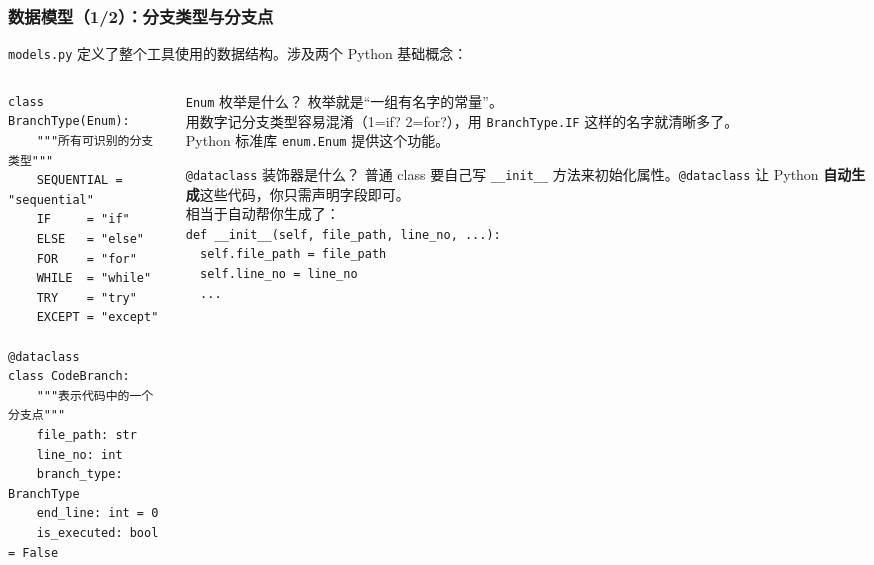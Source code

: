\documentclass[presentation,aspectratio=169]{ctexbeamer}
\begin{document}

\begin{frame}[fragile]
\frametitle{数据模型（1/2）：分支类型与分支点}
{\footnotesize \texttt{models.py} 定义了整个工具使用的数据结构。涉及两个 Python 基础概念：}

\vspace{0.1cm}
\begin{columns}[T]
\begin{column}{0.55\textwidth}
{\scriptsize
\begin{verbatim}
class BranchType(Enum):
    """所有可识别的分支类型"""
    SEQUENTIAL = "sequential"
    IF     = "if"
    ELSE   = "else"
    FOR    = "for"
    WHILE  = "while"
    TRY    = "try"
    EXCEPT = "except"

@dataclass
class CodeBranch:
    """表示代码中的一个分支点"""
    file_path: str
    line_no: int
    branch_type: BranchType
    end_line: int = 0
    is_executed: bool = False
\end{verbatim}}
\end{column}
\begin{column}{0.42\textwidth}
\begin{block}{\scriptsize \texttt{Enum} 枚举是什么？}
{\scriptsize 枚举就是``一组有名字的常量''。\\[2pt]
用数字记分支类型容易混淆（1=if? 2=for?），用 \texttt{BranchType.IF} 这样的名字就清晰多了。\\[2pt]
Python 标准库 \texttt{enum.Enum} 提供这个功能。}
\end{block}
\vspace{0.05cm}
\begin{block}{\scriptsize \texttt{@dataclass} 装饰器是什么？}
{\scriptsize 普通 class 要自己写 \texttt{\_\_init\_\_} 方法来初始化属性。\texttt{@dataclass} 让 Python \textbf{自动生成}这些代码，你只需声明字段即可。\\[2pt]
相当于自动帮你生成了：\\
\texttt{def \_\_init\_\_(self, file\_path, line\_no, ...):}\\
\texttt{~~self.file\_path = file\_path}\\
\texttt{~~self.line\_no = line\_no}\\
\texttt{~~...}}
\end{block}
\end{column}
\end{columns}
\end{frame}

\end{document}
